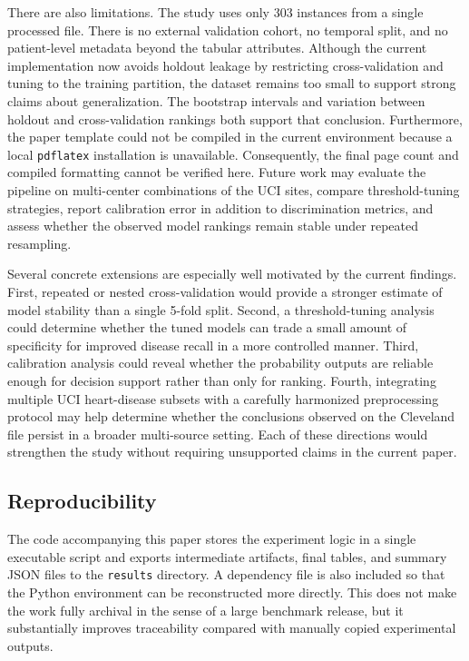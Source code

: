 \documentclass[conference]{IEEEtran}
\begin{document}
There are also limitations. The study uses only 303 instances from a single processed file. There is no external validation cohort, no temporal split, and no patient-level metadata beyond the tabular attributes. Although the current implementation now avoids holdout leakage by restricting cross-validation and tuning to the training partition, the dataset remains too small to support strong claims about generalization. The bootstrap intervals and variation between holdout and cross-validation rankings both support that conclusion. Furthermore, the paper template could not be compiled in the current environment because a local \texttt{pdflatex} installation is unavailable. Consequently, the final page count and compiled formatting cannot be verified here. Future work may evaluate the pipeline on multi-center combinations of the UCI sites, compare threshold-tuning strategies, report calibration error in addition to discrimination metrics, and assess whether the observed model rankings remain stable under repeated resampling.

Several concrete extensions are especially well motivated by the current findings. First, repeated or nested cross-validation would provide a stronger estimate of model stability than a single 5-fold split. Second, a threshold-tuning analysis could determine whether the tuned models can trade a small amount of specificity for improved disease recall in a more controlled manner. Third, calibration analysis could reveal whether the probability outputs are reliable enough for decision support rather than only for ranking. Fourth, integrating multiple UCI heart-disease subsets with a carefully harmonized preprocessing protocol may help determine whether the conclusions observed on the Cleveland file persist in a broader multi-source setting. Each of these directions would strengthen the study without requiring unsupported claims in the current paper.

\subsection{Reproducibility}
The code accompanying this paper stores the experiment logic in a single executable script and exports intermediate artifacts, final tables, and summary JSON files to the \texttt{results} directory. A dependency file is also included so that the Python environment can be reconstructed more directly. This does not make the work fully archival in the sense of a large benchmark release, but it substantially improves traceability compared with manually copied experimental outputs.
\end{document}

